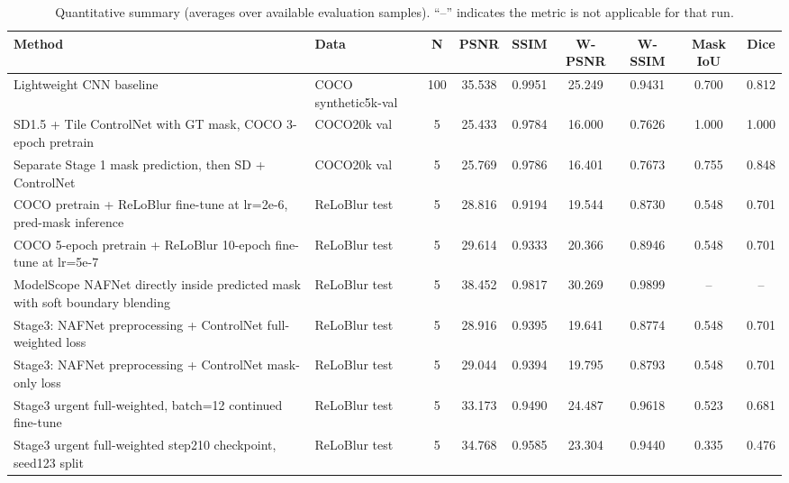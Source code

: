 \documentclass[11pt]{article}
\begin{document}
\begin{table}[htbp]
  \centering
  \caption{Quantitative summary (averages over available evaluation samples). ``--'' indicates the metric is not applicable for that run.}
  \label{tab:quant}
  \tiny
  \setlength{\tabcolsep}{2.2pt}
  \renewcommand{\arraystretch}{1.12}
  \begin{tabularx}{\linewidth}{>{\raggedright\arraybackslash}p{3.0cm} >{\raggedright\arraybackslash}p{1.8cm} c c c c c c c}
    \toprule
    Method & Data & N & PSNR & SSIM & W-PSNR & W-SSIM & Mask IoU & Dice \\
    \midrule
    Lightweight CNN baseline & COCO synthetic5k-val & 100 & 35.538 & 0.9951 & 25.249 & 0.9431 & 0.700 & 0.812 \\
    SD1.5 + Tile ControlNet with GT mask, COCO 3-epoch pretrain & COCO20k val & 5 & 25.433 & 0.9784 & 16.000 & 0.7626 & 1.000 & 1.000 \\
    Separate Stage 1 mask prediction, then SD + ControlNet & COCO20k val & 5 & 25.769 & 0.9786 & 16.401 & 0.7673 & 0.755 & 0.848 \\
    COCO pretrain + ReLoBlur fine-tune at lr=2e-6, pred-mask inference & ReLoBlur test & 5 & 28.816 & 0.9194 & 19.544 & 0.8730 & 0.548 & 0.701 \\
    COCO 5-epoch pretrain + ReLoBlur 10-epoch fine-tune at lr=5e-7 & ReLoBlur test & 5 & 29.614 & 0.9333 & 20.366 & 0.8946 & 0.548 & 0.701 \\
    ModelScope NAFNet directly inside predicted mask with soft boundary blending & ReLoBlur test & 5 & 38.452 & 0.9817 & 30.269 & 0.9899 & -- & -- \\
    Stage3: NAFNet preprocessing + ControlNet full-weighted loss & ReLoBlur test & 5 & 28.916 & 0.9395 & 19.641 & 0.8774 & 0.548 & 0.701 \\
    Stage3: NAFNet preprocessing + ControlNet mask-only loss & ReLoBlur test & 5 & 29.044 & 0.9394 & 19.795 & 0.8793 & 0.548 & 0.701 \\
    Stage3 urgent full-weighted, batch=12 continued fine-tune & ReLoBlur test & 5 & 33.173 & 0.9490 & 24.487 & 0.9618 & 0.523 & 0.681 \\
    Stage3 urgent full-weighted step210 checkpoint, seed123 split & ReLoBlur test & 5 & 34.768 & 0.9585 & 23.304 & 0.9440 & 0.335 & 0.476 \\
    \bottomrule
  \end{tabularx}
\end{table}
\end{document}
